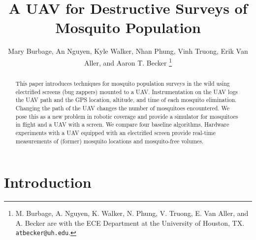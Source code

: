 \documentclass[letterpaper, 10 pt, conference]{ieeeconf}  %
\title{\LARGE \bf
A UAV for Destructive Surveys of Mosquito Population
}
\author{Mary Burbage, An Nguyen, Kyle Walker, Nhan Phung, Vinh Truong, Erik Van Aller, and Aaron T. Becker%
\thanks{M. Burbage, A. Nguyen, K. Walker, N. Phung, V. Truong, E. Van Aller, and A. Becker are with the ECE Department at the University of Houston, TX.
        {\tt\small atbecker@uh.edu}.}%
}
\begin{document}
\maketitle
\thispagestyle{empty}
\pagestyle{empty}


\begin{abstract}
This paper introduces techniques for mosquito population surveys in the wild using electrified screens (bug zappers) mounted to a UAV. Instrumentation on the UAV logs the UAV path and the GPS location, altitude, and time of each mosquito elimination. Changing the path of the UAV changes the number of mosquitoes encountered.  We pose this as a new problem in robotic coverage and provide a simulator for mosquitoes in flight and a UAV with a screen. We compare four baseline algorithms.
  Hardware experiments with a UAV equipped with an electrified screen provide real-time measurements of (former) mosquito locations and mosquito-free volumes. 
\end{abstract}




\section{Introduction}
\end{document}

